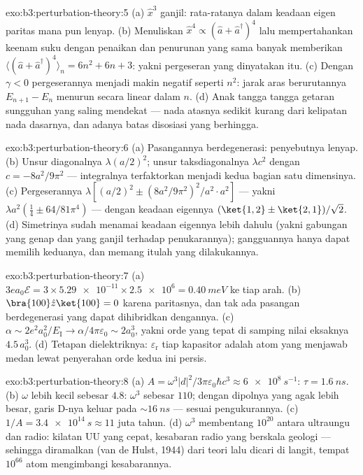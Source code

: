 \begin{solution}{exo:b3:perturbation-theory:5}
(a) $\hat x^3$ ganjil: rata-ratanya dalam keadaan eigen paritas mana pun
lenyap. (b) Menuliskan $\hat x^4 \propto (\hat a + \hat
a^\dagger)^4$ lalu mempertahankan keenam suku dengan penaikan dan
penurunan yang sama banyak memberikan $\langle(\hat a + \hat a^\dagger)^4\rangle_n = 6n^2
+ 6n + 3$: yakni pergeseran yang dinyatakan itu. (c) Dengan $\gamma < 0$
pergeserannya menjadi makin negatif seperti $n^2$: jarak aras
berurutannya $E_{n+1} - E_n$ menurun secara linear dalam $n$. (d) Anak
tangga tangga getaran sungguhan yang saling mendekat --- nada atasnya
sedikit kurang dari kelipatan nada dasarnya, dan adanya batas disosiasi
yang berhingga.
\end{solution}

\begin{solution}{exo:b3:perturbation-theory:6}
(a) Pasangannya berdegenerasi: penyebutnya lenyap. (b) Unsur
diagonalnya $\lambda(a/2)^2$; unsur taksdiagonalnya $\lambda c^2$ dengan $c =
-8a^2/9\pi^2$ --- integralnya terfaktorkan menjadi kedua bagian
satu dimensinya. (c) Pergeserannya $\lambda[(a/2)^2 \pm
(8a^2/9\pi^2)^2/a^2\cdot a^2]$ --- yakni $\lambda a^2(\tfrac14 \pm
64/81\pi^4)$ --- dengan keadaan eigennya $(\ket{1,2} \pm \ket{2,1})/
\sqrt2$. (d) Simetrinya sudah menamai keadaan eigennya lebih dahulu
(yakni gabungan yang genap dan yang ganjil terhadap penukarannya);
gangguannya hanya dapat memilih keduanya, dan memang itulah yang
dilakukannya.
\end{solution}

\begin{solution}{exo:b3:perturbation-theory:7}
(a) $3ea_0\mathcal E = 3 \times \num{5.29e-11} \times \num{2.5e6}
= \qty{0.40}{meV}$ ke tiap arah. (b) $\bra{100}\hat z\ket{100} = 0$
karena paritasnya, dan tak ada pasangan berdegenerasi yang dapat
dihibridkan dengannya. (c)
$\alpha \sim 2e^2a_0^2/E_{\text{I}} \to \alpha/4\pi\varepsilon_0
\sim 2a_0^3$, yakni orde yang tepat di samping nilai eksaknya $4.5\,a_0^3$. (d)
Tetapan dielektriknya: $\varepsilon_{\text{r}}$ tiap kapasitor adalah
atom yang menjawab medan lewat penyerahan orde kedua ini persis.
\end{solution}

\begin{solution}{exo:b3:perturbation-theory:8}
(a) $A = \omega^3|d|^2/3\pi\varepsilon_0\hbar c^3 \approx
\qty{6e8}{s^{-1}}$: $\tau = \qty{1.6}{ns}$. (b) $\omega$ lebih kecil
sebesar $4.8$: $\omega^3$ sebesar $110$; dengan dipolnya yang agak
lebih besar, garis D-nya keluar pada $\sim\qty{16}{ns}$ --- sesuai
pengukurannya. (c)
$1/A = \qty{3.4e14}{s} \approx 11$ juta tahun. (d) $\omega^3$
membentang $10^{20}$ antara ultraungu dan radio: kilatan UU yang cepat,
kesabaran radio yang berskala geologi --- sehingga 
diramalkan (van de Hulst, 1944) dari teori lalu dicari di langit,
tempat $10^{66}$ atom mengimbangi kesabarannya.
\end{solution}

